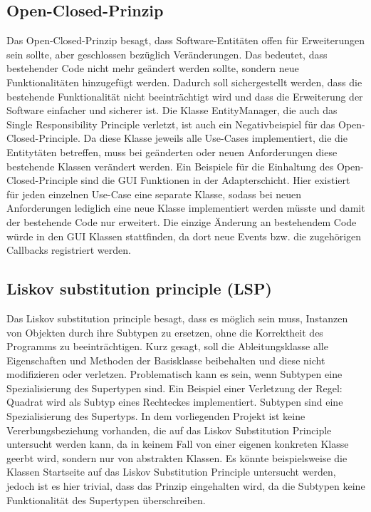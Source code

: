 \subsection{Open-Closed-Prinzip}
Das Open-Closed-Prinzip besagt, dass Software-Entitäten offen für Erweiterungen sein sollte, aber geschlossen bezüglich Veränderungen. Das bedeutet, dass bestehender Code nicht mehr geändert werden sollte, sondern neue Funktionalitäten hinzugefügt werden. Dadurch soll sichergestellt werden, dass die bestehende Funktionalität nicht beeinträchtigt wird und dass die Erweiterung der Software einfacher und sicherer ist. Die Klasse EntityManager, die auch das Single Responsibility Principle verletzt, ist auch ein Negativbeispiel für das Open-Closed-Principle. Da diese Klasse jeweils alle Use-Cases implementiert, die die Entitytäten betreffen, muss bei geänderten oder neuen Anforderungen diese bestehende Klassen verändert werden.
Ein Beispiele für die Einhaltung des Open-Closed-Principle sind die GUI Funktionen in der Adapterschicht.
Hier existiert für jeden einzelnen Use-Case eine separate Klasse, sodass bei
neuen Anforderungen lediglich eine neue Klasse implementiert werden müsste
und damit der bestehende Code nur erweitert. Die einzige Änderung an bestehendem Code würde in den GUI Klassen stattfinden, da dort neue Events bzw. die zugehörigen Callbacks registriert werden.

\subsection{Liskov substitution principle (LSP)}
Das Liskov substitution principle besagt, dass es möglich sein muss, Instanzen von Objekten durch ihre Subtypen zu ersetzen, ohne die Korrektheit des Programms zu beeinträchtigen. Kurz gesagt, soll die Ableitungsklasse alle Eigenschaften und Methoden der Basisklasse beibehalten und diese nicht modifizieren oder verletzen. Problematisch kann es sein, wenn Subtypen eine Spezialisierung des Supertypen sind. Ein Beispiel einer Verletzung der Regel: Quadrat wird als Subtyp eines Rechteckes implementiert. Subtypen sind eine Spezialisierung des Supertyps.
In dem vorliegenden Projekt ist keine Vererbungsbeziehung vorhanden, die auf das Liskov Substitution Principle untersucht werden kann, da in keinem Fall
von einer eigenen konkreten Klasse geerbt wird, sondern nur von abstrakten Klassen. Es könnte beispielsweise die Klassen Startseite auf das
Liskov Substitution Principle untersucht werden, jedoch ist es hier trivial, dass das Prinzip eingehalten wird, da die Subtypen keine Funktionalität des Supertypen überschreiben.

